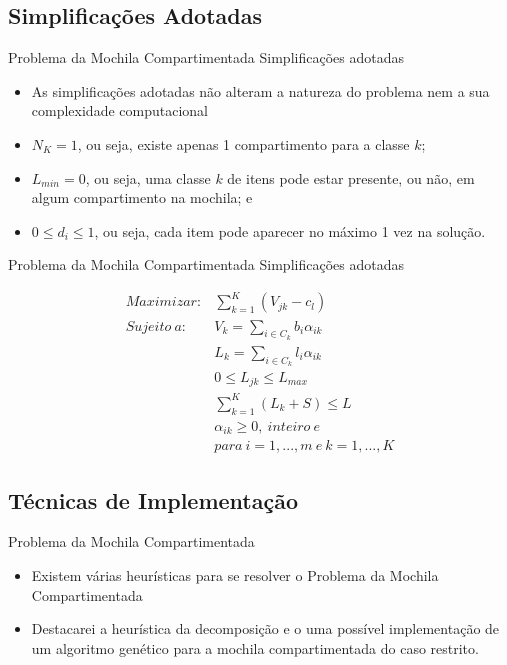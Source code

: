 \documentclass[slidestop,compress,mathserif]{beamer}
\begin{document}
\subsection{Simplificações Adotadas}
\begin{frame} {Problema da Mochila Compartimentada} {Simplificações adotadas}

\begin{itemize}
 \item As simplificações adotadas não alteram a natureza do problema nem a sua complexidade computacional
\end{itemize}

\begin{itemize}
	\item $N_K=1$, ou seja, existe apenas 1 compartimento para a classe $k$;
	\item $L_{min}=0$, ou seja, uma classe $k$ de itens pode estar presente, ou não, em algum compartimento na mochila; e
	\item $0 \leq d_i \leq 1$, ou seja, cada item pode aparecer no máximo 1 vez na solução.
\end{itemize}

\end{frame}


\begin{frame} {Problema da Mochila Compartimentada} {Simplificações adotadas}

\begin{eqnarray}
	Maximizar: & \displaystyle \sum_{k = 1}^{K}(V_{jk} - c_{l}) \\
	Sujeito \ a: &  \displaystyle V_{k} = \sum_{i \in C_{k}}b_{i}\alpha_{ik} \\
	& \displaystyle L_{k} = \sum_{i \in C_{k}}l_{i}\alpha_{ik} \\
	& \displaystyle 0 \leq L_{jk} \leq L_{max} \\
	& \displaystyle \sum_{k = 1}^{K}(L_{k} + S) \leq L \\
	& \displaystyle \alpha_{ik} \geq 0, \ inteiro \ e \nonumber\\
	& \displaystyle para \ i = 1, ..., m \ e \ k = 1, ..., K \nonumber
\end{eqnarray}

\end{frame}


\subsection{Técnicas de Implementação}
\begin{frame} {Problema da Mochila Compartimentada}

\begin{itemize}
 \item Existem várias heurísticas para se resolver o Problema da Mochila Compartimentada
 \item Destacarei a heurística da decomposição e o uma possível implementação de um algoritmo genético para a mochila compartimentada do caso restrito. 
\end{itemize}

\end{frame}
\end{document}
